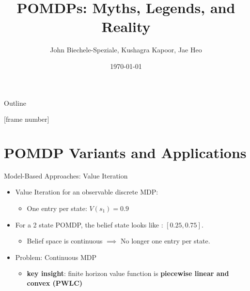 \documentclass[presentation, smaller]{beamer}
\author{John Biechele-Speziale, Kushagra Kapoor, Jae Heo}
\date{\today}
\title{POMDPs: Myths, Legends, and Reality}
\begin{document}
\maketitle
\begin{frame}{Outline}
\setcounter{tocdepth}{1}
\tableofcontents
\end{frame}

[frame number]

\section{POMDP Variants and Applications}

\begin{frame}{Model-Based Approaches: Value Iteration}
    \begin{itemize}
        \item Value Iteration for an observable discrete MDP:
        \begin{itemize}
            \item One entry per state: $V(s_1) = 0.9$
        \end{itemize}
        
        \item For a 2 state POMDP, the belief state looks like : $[0.25, 0.75]$. 
        \begin{itemize}
            \item Belief space is continuous $\implies$ No longer one entry per state.
        \end{itemize}
        \item Problem: Continuous MDP
        \begin{itemize}
            \item \textbf{key insight}: finite horizon value function is \textbf{piecewise linear and convex (PWLC)}
        \end{itemize}
        
    \end{itemize}
    
\end{frame}
\end{document}
